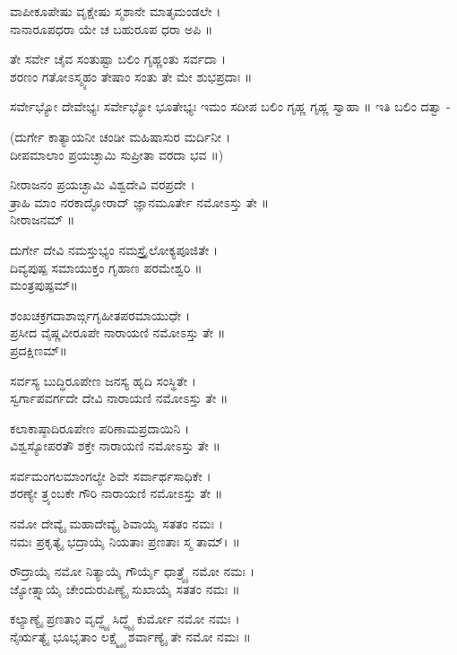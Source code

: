 ವಾಪೀಕೂಪೇಷು ವೃಕ್ಷೇಷು ಸ್ಮಶಾನೇ ಮಾತೃಮಂಡಲೇ ।\\
ನಾನಾರೂಪಧರಾ ಯೇ ಚ ಬಹುರೂಪ ಧರಾ ಅಪಿ ॥

ತೇ ಸರ್ವೇ ಚೈವ ಸಂತುಷ್ಟಾ ಬಲಿಂ ಗೃಹ್ಣಂತು ಸರ್ವದಾ ।\\
ಶರಣಂ ಗತೋಽಸ್ಮ್ಯಹಂ ತೇಷಾಂ ಸಂತು ತೇ ಮೇ ಶುಭಪ್ರದಾಃ ॥

ಸರ್ವೇಭ್ಯೋ ದೇವೇಭ್ಯಃ ಸರ್ವೇಭ್ಯೋ ಭೂತೇಭ್ಯಃ ಇಮಂ ಸದೀಪ ಬಲಿಂ ಗೃಹ್ಣ ಗೃಹ್ಣ ಸ್ವಾಹಾ ॥ ಇತಿ ಬಲಿಂ ದತ್ವಾ -

(ದುರ್ಗೇ ಕಾತ್ಯಾಯನೀ ಚಂಡೀ ಮಹಿಷಾಸುರ ಮರ್ದಿನೀ ।\\
ದೀಪಮಾಲಾಂ ಪ್ರಯಚ್ಛಾಮಿ ಸುಪ್ರೀತಾ ವರದಾ ಭವ ॥)

ನೀರಾಜನಂ ಪ್ರಯಚ್ಛಾಮಿ ವಿಶ್ವದೇವಿ ವರಪ್ರದೇ ।\\
ತ್ರಾಹಿ ಮಾಂ ನರಕಾದ್ಘೋರಾದ್ ಜ್ಞಾನಮೂರ್ತೇ ನಮೋಽಸ್ತು ತೇ ॥\\
ನೀರಾಜನಮ್ ॥

ದುರ್ಗೇ ದೇವಿ ನಮಸ್ತುಭ್ಯಂ ನಮಸ್ತ್ರೈಲೋಕ್ಯಪೂಜಿತೇ ।\\
ದಿವ್ಯಪುಷ್ಪ ಸಮಾಯುಕ್ತಂ ಗೃಹಾಣ ಪರಮೇಶ್ವರಿ ॥\\
ಮಂತ್ರಪುಷ್ಪಮ್॥

ಶಂಖಚಕ್ರಗದಾಶಾರ್ಙ್ಗಗೃಹೀತಪರಮಾಯುಧೇ ।\\
ಪ್ರಸೀದ ವೈಷ್ಣವೀರೂಪೇ ನಾರಾಯಣಿ ನಮೋಽಸ್ತು ತೇ ॥\\
ಪ್ರದಕ್ಷಿಣಮ್॥

ಸರ್ವಸ್ಯ ಬುದ್ಧಿರೂಪೇಣ ಜನಸ್ಯ ಹೃದಿ ಸಂಸ್ಥಿತೇ ।\\
ಸ್ವರ್ಗಾಪವರ್ಗದೇ ದೇವಿ ನಾರಾಯಣಿ ನಮೋಽಸ್ತು ತೇ ॥

ಕಲಾಕಾಷ್ಠಾದಿರೂಪೇಣ ಪರಿಣಾಮಪ್ರದಾಯಿನಿ ।\\
ವಿಶ್ವಸ್ಯೋಪರತೌ ಶಕ್ತೇ ನಾರಾಯಣಿ ನಮೋಽಸ್ತು ತೇ ॥

ಸರ್ವಮಂಗಲಮಾಂಗಲ್ಯೇ ಶಿವೇ ಸರ್ವಾರ್ಥಸಾಧಿಕೇ ।\\
ಶರಣ್ಯೇ ತ್ರ್ಯಂಬಕೇ ಗೌರಿ ನಾರಾಯಣಿ ನಮೋಽಸ್ತು ತೇ ॥

ನಮೋ ದೇವ್ಯೈ ಮಹಾದೇವ್ಯೈ ಶಿವಾಯೈ ಸತತಂ ನಮಃ ।\\
ನಮಃ ಪ್ರಕೃತ್ಯೈ ಭದ್ರಾಯೈ ನಿಯತಾಃ ಪ್ರಣತಾಃ ಸ್ಮ ತಾಮ್। ॥

ರೌದ್ರಾಯೈ ನಮೋ ನಿತ್ಯಾಯೈ ಗೌರ್ಯೈ ಧಾತ್ರ್ಯೈ ನಮೋ ನಮಃ ।\\
ಜ್ಯೋತ್ಸ್ನಾಯೈ ಚೇಂದುರುಪಿಣ್ಯೈ ಸುಖಾಯೈ ಸತತಂ ನಮಃ ॥

ಕಲ್ಯಾಣ್ಯೈ ಪ್ರಣತಾಂ ವೃದ್ಧ್ಯೈ ಸಿದ್ಧ್ಯೈ ಕುರ್ಮೋ ನಮೋ ನಮಃ ।\\
ನೈರ್ಋತ್ಯೈ ಭೂಭೃತಾಂ ಲಕ್ಷ್ಮ್ಯೈ ಶರ್ವಾಣ್ಯೈ ತೇ ನಮೋ ನಮಃ ॥

